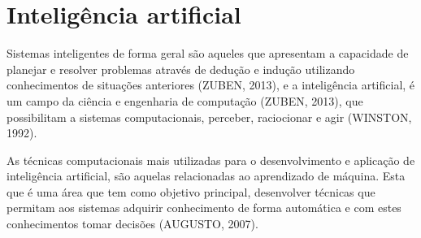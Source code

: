 




\section{Inteligência artificial}



Sistemas inteligentes de forma geral são aqueles que apresentam a capacidade de planejar e resolver problemas através de dedução e indução utilizando conhecimentos de situações anteriores (ZUBEN, 2013), e a inteligência artificial, é um campo da ciência e engenharia de computação (ZUBEN, 2013), que possibilitam a sistemas computacionais, perceber, raciocionar e agir (WINSTON, 1992).

As técnicas computacionais mais utilizadas para o desenvolvimento e aplicação de inteligência artificial, são aquelas relacionadas ao aprendizado de máquina. Esta que é uma área que tem como objetivo principal, desenvolver técnicas que permitam aos sistemas adquirir conhecimento de forma automática e com estes conhecimentos tomar decisões (AUGUSTO, 2007).

